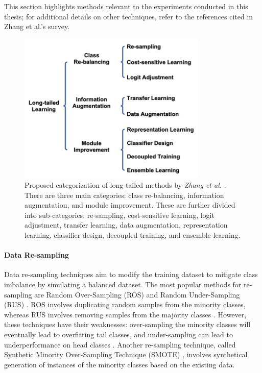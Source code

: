 This section highlights methods relevant to the experiments conducted in this thesis; for additional details on other techniques, refer to the references cited in Zhang et al.'s survey.

\begin{figure}[ht]
    \centering
    \includegraphics[width=0.8\textwidth]{Images/lt_methods_categories.png} 
    \caption{Proposed categorization of long-tailed methods by \emph{Zhang et al.} \cite{zhang2023deep}. There are three main categories: class re-balancing, information augmentation, and module improvement. These are further divided into sub-categories: re-sampling, cost-sensitive learning, logit adjustment, transfer learning, data augmentation, representation learning, classifier design, decoupled training, and ensemble learning.}
    \label{fig:lt_methods} 
\end{figure}


\paragraph{Data Re-sampling}
Data re-sampling techniques aim to modify the training dataset to mitigate class imbalance by simulating a balanced dataset. The most popular methods for re-sampling are Random Over-Sampling (ROS) and Random Under-Sampling (RUS) \cite{Chawla_2002}. ROS involves duplicating random samples from the minority classes, whereas RUS involves removing samples from the majority classes \cite{zhang2023deep}. However, these techniques have their weaknesses: over-sampling the minority classes will eventually lead to overfitting tail classes, and under-sampling can lead to underperformance on head classes \cite{zhang2023deep}. Another re-sampling technique, called Synthetic Minority Over-Sampling Technique (SMOTE) \cite{Chawla_2002}, involves synthetical generation of instances of the minority classes based on the existing data.


